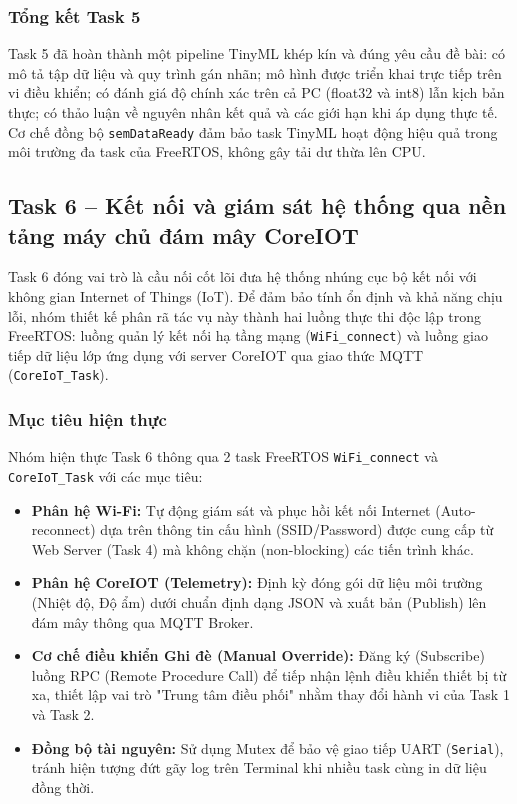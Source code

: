 \subsubsection*{Tổng kết Task 5}

Task 5 đã hoàn thành một pipeline TinyML khép kín và đúng yêu cầu đề bài: có mô tả tập dữ liệu và quy trình gán nhãn; mô hình được triển khai trực tiếp trên vi điều khiển; có đánh giá độ chính xác trên cả PC (float32 và int8) lẫn kịch bản thực; có thảo luận về nguyên nhân kết quả và các giới hạn khi áp dụng thực tế. Cơ chế đồng bộ \texttt{semDataReady} đảm bảo task TinyML hoạt động hiệu quả trong môi trường đa task của FreeRTOS, không gây tải dư thừa lên CPU.


\subsection{Task 6 -- Kết nối và giám sát hệ thống qua nền tảng máy chủ đám mây CoreIOT}

Task 6 đóng vai trò là cầu nối cốt lõi đưa hệ thống nhúng cục bộ kết nối với không gian Internet of Things (IoT). Để đảm bảo tính ổn định và khả năng chịu lỗi, nhóm thiết kế phân rã tác vụ này thành hai luồng thực thi độc lập trong FreeRTOS: luồng quản lý kết nối hạ tầng mạng (\texttt{WiFi\_connect}) và luồng giao tiếp dữ liệu lớp ứng dụng với server CoreIOT qua giao thức MQTT (\texttt{CoreIoT\_Task}).

\subsubsection*{Mục tiêu hiện thực}

Nhóm hiện thực Task 6 thông qua 2 task FreeRTOS \texttt{WiFi\_connect} và \texttt{CoreIoT\_Task} với các mục tiêu:
\begin{itemize}
    \item \textbf{Phân hệ Wi-Fi:} Tự động giám sát và phục hồi kết nối Internet (Auto-reconnect) dựa trên thông tin cấu hình (SSID/Password) được cung cấp từ Web Server (Task 4) mà không chặn (non-blocking) các tiến trình khác.
    \item \textbf{Phân hệ CoreIOT (Telemetry):} Định kỳ đóng gói dữ liệu môi trường (Nhiệt độ, Độ ẩm) dưới chuẩn định dạng JSON và xuất bản (Publish) lên đám mây thông qua MQTT Broker.
    \item \textbf{Cơ chế điều khiển Ghi đè (Manual Override):} Đăng ký (Subscribe) luồng RPC (Remote Procedure Call) để tiếp nhận lệnh điều khiển thiết bị từ xa, thiết lập vai trò "Trung tâm điều phối" nhằm thay đổi hành vi của Task 1 và Task 2.
    \item \textbf{Đồng bộ tài nguyên:} Sử dụng Mutex để bảo vệ giao tiếp UART (\texttt{Serial}), tránh hiện tượng đứt gãy log trên Terminal khi nhiều task cùng in dữ liệu đồng thời.
\end{itemize}


